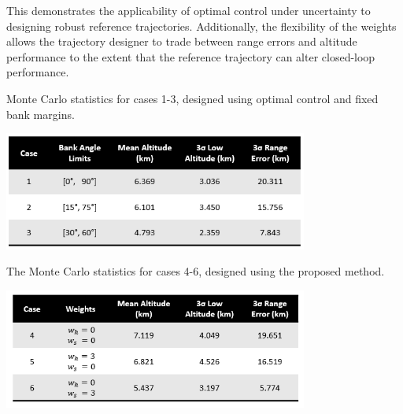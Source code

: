 \documentclass[journal ]{new-aiaa}
\begin{document}
This demonstrates the applicability of optimal control under uncertainty to designing robust reference trajectories. Additionally, the flexibility of the weights allows the trajectory designer to trade between range errors and altitude performance to the extent that the reference trajectory can alter closed-loop performance. 
\begin{table}[h!]
	\centering
	\caption{Monte Carlo statistics for cases 1-3, designed using optimal control and fixed bank margins.}
	\includegraphics[width=0.75\textwidth]{ddp/table_deterministic}
	\label{table_deterministic}
\end{table}
\begin{table}[h!]
	\centering
	\caption{The Monte Carlo statistics for cases 4-6, designed using the proposed method.}
	\includegraphics[width=0.75\textwidth]{ddp/table_robust} %
	\label{table_robust}
\end{table}
\end{document}
